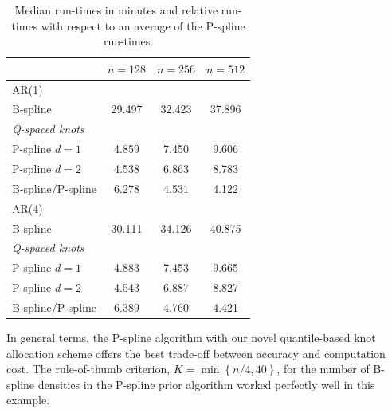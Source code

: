 \documentclass[twocolumn,final]{svjour3}
\begin{document}
\begin{table}
	\centering
		\begin{tabular}{lccc}
			\toprule
			& $n=128$ & $n=256$ & $n=512$ \\ \hline
			AR(1)     &  &  &  \\ 
			B-spline &   29.497 & 32.423 & 37.896 \\
			\textit{Q-spaced knots}& & &   \\
			\hspace{0.5em}P-spline $d=1$&  4.859 & 7.450 & 9.606\\
			\hspace{0.5em}P-spline $d=2$&  4.538 & 6.863 & 8.783\\
			B-spline/P-spline &  6.278 & 4.531 & 4.122 \\ \hline
			AR(4)     &  &  & \\ 
			B-spline & 30.111 & 34.126 & 40.875  \\
			\textit{Q-spaced knots}& & &   \\
			\hspace{0.5em}P-spline $d=1$ & 4.883 & 7.453 & 9.665 \\
			\hspace{0.5em}P-spline $d=2$& 4.543 & 6.887 & 8.827 \\
			B-spline/P-spline & 6.389 & 4.760 & 4.421 \\	
			\bottomrule
		\end{tabular}
	\caption{Median run-times in minutes and relative run-times with respect to an average of the P-spline run-times.}
	\label{table:sim_time}
\end{table}


In general terms, the P-spline algorithm with our novel quantile-based  knot allocation scheme offers the best trade-off between accuracy and computation cost.  The  rule-of-thumb criterion,  $K=\min\left\{n/4, 40\right\}$, for the number of B-spline densities in the P-spline prior algorithm worked perfectly well in this example. 

\end{document}
